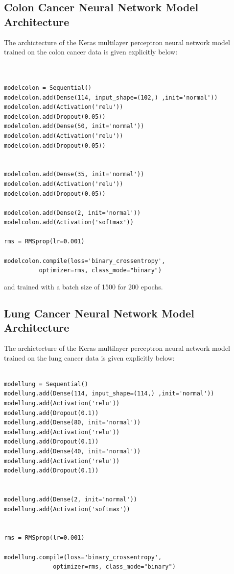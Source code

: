 \documentclass[10pt,letterpaper]{article}
\begin{document}
\subsection*{Colon Cancer Neural Network Model Architecture}
\label{subsec:colonnn}

The archictecture of the Keras multilayer perceptron neural network model 
trained on the colon cancer data is given explicitly below:

\begin{verbatim}


modelcolon = Sequential()
modelcolon.add(Dense(114, input_shape=(102,) ,init='normal'))
modelcolon.add(Activation('relu'))
modelcolon.add(Dropout(0.05))
modelcolon.add(Dense(50, init='normal'))
modelcolon.add(Activation('relu'))
modelcolon.add(Dropout(0.05))


modelcolon.add(Dense(35, init='normal'))
modelcolon.add(Activation('relu'))
modelcolon.add(Dropout(0.05))

modelcolon.add(Dense(2, init='normal'))
modelcolon.add(Activation('softmax'))

rms = RMSprop(lr=0.001)

modelcolon.compile(loss='binary_crossentropy',
          optimizer=rms, class_mode="binary")

\end{verbatim}

and trained with a batch size of 1500 for 200 epochs.


\subsection*{Lung Cancer Neural Network Model Architecture}
\label{subsec:lungnn}


The archictecture of the Keras multilayer perceptron neural network model 
trained on the lung cancer data is given explicitly below:

\begin{verbatim}

modellung = Sequential()
modellung.add(Dense(114, input_shape=(114,) ,init='normal'))
modellung.add(Activation('relu'))
modellung.add(Dropout(0.1))
modellung.add(Dense(80, init='normal'))
modellung.add(Activation('relu'))
modellung.add(Dropout(0.1))
modellung.add(Dense(40, init='normal'))
modellung.add(Activation('relu'))
modellung.add(Dropout(0.1))


modellung.add(Dense(2, init='normal'))
modellung.add(Activation('softmax'))


rms = RMSprop(lr=0.001)

modellung.compile(loss='binary_crossentropy',
              optimizer=rms, class_mode="binary")

\end{verbatim}
\end{document}
